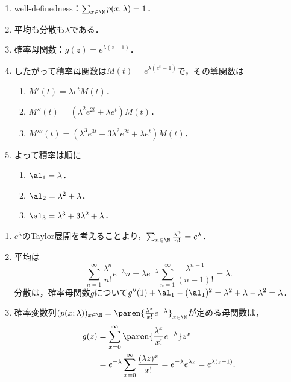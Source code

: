 \documentclass[uplatex,dvipdfmx]{jsreport}
\begin{document}
\begin{proposition}[分布の特性値]\mbox{}
    \begin{enumerate}
        \item well-definedness：$\sum_{x\in\N}p(x;\lambda)=1$．
        \item 平均も分散も$\lambda$である．
        \item 確率母関数：$g(z)=e^{\lambda(z-1)}$．
        \item したがって積率母関数は$M(t)=e^{\lambda(e^t-1)}$で，その導関数は
        \begin{enumerate}
            \item $M'(t)=\lambda e^tM(t)$．
            \item $M''(t)=(\lambda^2e^{2t}+\lambda e^t)M(t)$．
            \item $M'''(t)=(\lambda^3e^{3t}+3\lambda^2e^{2t}+\lambda e^t)M(t)$．
        \end{enumerate}
        \item よって積率は順に
        \begin{enumerate}
            \item $\al_1=\lambda$．
            \item $\al_2=\lambda^2+\lambda$．
            \item $\al_3=\lambda^3+3\lambda^2+\lambda$．
        \end{enumerate}
    \end{enumerate}
\end{proposition}
\begin{Proof}\mbox{}
    \begin{enumerate}
        \item $e^\lambda$のTaylor展開を考えることより，$\sum_{n\in\N}\frac{\lambda^n}{n!}=e^\lambda$．
        \item 平均は
        \[\sum_{n=1}^\infty\frac{\lambda^n}{n!}e^{-\lambda}n=\lambda e^{-\lambda}\sum_{n=1}^\infty\frac{\lambda^{n-1}}{(n-1)!}=\lambda.\]
        分散は，確率母関数$g$について$g''(1)+\al_1-(\al_1)^2=\lambda^2+\lambda-\lambda^2=\lambda$．
        \item 確率変数列$(p(x;\lambda))_{x\in\N}=\paren{\frac{\lambda^x}{x!}e^{-\lambda}}_{x\in\N}$が定める母関数は，
        \begin{align*}
            g(z)&=\sum_{x=0}^\infty \paren{\frac{\lambda^x}{x!}e^{-\lambda}}z^x\\
            &=e^{-\lambda}\sum_{x=0}^\infty\frac{(\lambda z)^x}{x!}=e^{-\lambda}e^{\lambda z}=e^{\lambda(z-1)}.
        \end{align*}
    \end{enumerate}
\end{Proof}
\end{document}
